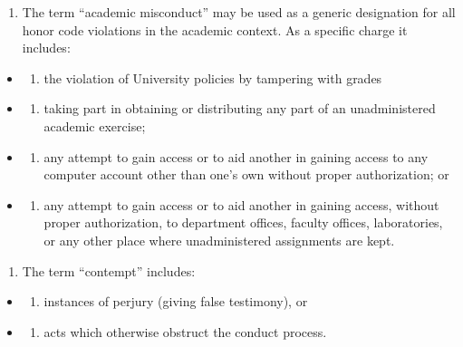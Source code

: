 \documentclass[
]{book}
\providecommand{\tightlist}{%
  \setlength{\itemsep}{0pt}\setlength{\parskip}{0pt}}
\begin{document}
\begin{enumerate}
\def\labelenumi{\arabic{enumi}.}
\setcounter{enumi}{4}
\tightlist
\item
  The term ``academic misconduct'' may be used as a generic designation for all honor code violations in the academic context. As a specific charge it includes:
\end{enumerate}

\begin{itemize}
\item
  \begin{enumerate}
  \def\labelenumi{(\alph{enumi})}
  \tightlist
  \item
    the violation of University policies by tampering with grades
  \end{enumerate}
\item
  \begin{enumerate}
  \def\labelenumi{(\alph{enumi})}
  \setcounter{enumi}{1}
  \tightlist
  \item
    taking part in obtaining or distributing any part of an unadministered academic exercise;
  \end{enumerate}
\item
  \begin{enumerate}
  \def\labelenumi{(\alph{enumi})}
  \setcounter{enumi}{2}
  \tightlist
  \item
    any attempt to gain access or to aid another in gaining access to any computer account other than one's own without proper authorization; or
  \end{enumerate}
\item
  \begin{enumerate}
  \def\labelenumi{(\alph{enumi})}
  \setcounter{enumi}{3}
  \tightlist
  \item
    any attempt to gain access or to aid another in gaining access, without proper authorization, to department offices, faculty offices, laboratories, or any other place where unadministered assignments are kept.
  \end{enumerate}
\end{itemize}

\begin{enumerate}
\def\labelenumi{\arabic{enumi}.}
\setcounter{enumi}{5}
\tightlist
\item
  The term ``contempt'' includes:
\end{enumerate}

\begin{itemize}
\item
  \begin{enumerate}
  \def\labelenumi{(\alph{enumi})}
  \tightlist
  \item
    instances of perjury (giving false testimony), or
  \end{enumerate}
\item
  \begin{enumerate}
  \def\labelenumi{(\alph{enumi})}
  \setcounter{enumi}{1}
  \tightlist
  \item
    acts which otherwise obstruct the conduct process.
  \end{enumerate}
\end{itemize}
\end{document}
